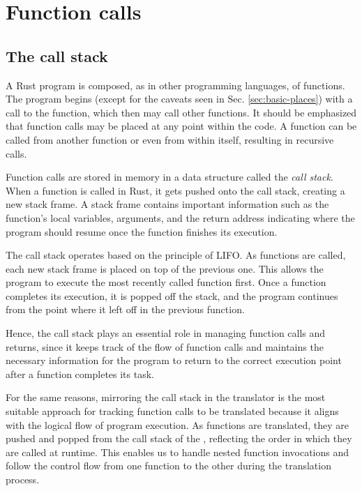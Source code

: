 \section{Function calls}
\label{sec:function-calls}

\subsection{The call stack}

A Rust program is composed, as in other programming languages, of functions.
The program begins (except for the caveats seen in Sec. \ref{sec:basic-places})
with a call to the  function, which then may call other functions.
It should be emphasized that function calls may be placed at any point within the code.
A function can be called from another function or even from within itself, resulting in recursive calls.

Function calls are stored in memory in a data structure called the \emph{call stack}.
When a function is called in Rust, it gets pushed onto the call stack, creating a new stack frame.
A stack frame contains important information such as the function's local variables, arguments,
and the return address indicating where the program should resume once the function finishes its execution.

The call stack operates based on the principle of \acrfull{LIFO}.
As functions are called, each new stack frame is placed on top of the previous one.
This allows the program to execute the most recently called function first.
Once a function completes its execution, it is popped off the stack,
and the program continues from the point where it left off in the previous function.

Hence, the call stack plays an essential role in managing function calls and returns,
since it keeps track of the flow of function calls and maintains the necessary information
for the program to return to the correct execution point after a function completes its task.

For the same reasons, mirroring the call stack in the translator
is the most suitable approach for tracking function calls to be translated
because it aligns with the logical flow of program execution.
As functions are translated, they are pushed and popped
from the call stack of the ,
reflecting the order in which they are called at runtime.
This enables us to handle nested function invocations and
follow the control flow from one function to the other during the translation process.

